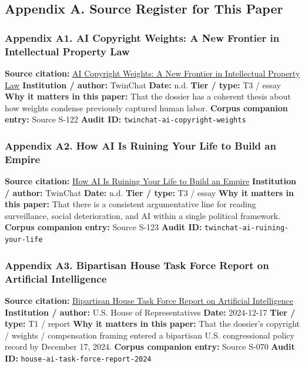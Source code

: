 \documentclass[
  american,
  11pt,
  letterpaper,
]{article}
\begin{document}
\subsection{Appendix A. Source Register for This
Paper}\label{appendix-a.-source-register-for-this-paper}

\subsubsection{Appendix A1. AI Copyright Weights: A New Frontier in
Intellectual Property
Law}\label{appendix-a1-ai-copyright-weights-a-new-frontier-in-intellectual-property-law}

\textbf{Source citation:}
\href{https://medium.com/twinchat/ai-copyright-weights-a-new-frontier-in-intellectual-property-law-d8ee1b6c55ee}{AI
Copyright Weights: A New Frontier in Intellectual Property Law}
\textbf{Institution / author:} TwinChat \textbf{Date:} n.d. \textbf{Tier
/ type:} T3 / essay \textbf{Why it matters in this paper:} That the
dossier has a coherent thesis about how weights condense previously
captured human labor. \textbf{Corpus companion entry:} Source S-122
\textbf{Audit ID:} \texttt{twinchat-ai-copyright-weights}

\subsubsection{Appendix A2. How AI Is Ruining Your Life to Build an
Empire}\label{appendix-a2-how-ai-is-ruining-your-life-to-build-an-empire}

\textbf{Source citation:}
\href{https://medium.com/twinchat/how-ai-is-ruining-your-life-to-build-an-empire-8b6d02e55bc9}{How
AI Is Ruining Your Life to Build an Empire} \textbf{Institution /
author:} TwinChat \textbf{Date:} n.d. \textbf{Tier / type:} T3 / essay
\textbf{Why it matters in this paper:} That there is a consistent
argumentative line for reading surveillance, social deterioration, and
AI within a single political framework. \textbf{Corpus companion entry:}
Source S-123 \textbf{Audit ID:} \texttt{twinchat-ai-ruining-your-life}

\subsubsection{Appendix A3. Bipartisan House Task Force Report on
Artificial
Intelligence}\label{appendix-a3-bipartisan-house-task-force-report-on-artificial-intelligence}

\textbf{Source citation:}
\href{https://www.speaker.gov/wp-content/uploads/2024/12/AI-Task-Force-Report-FINAL.pdf}{Bipartisan
House Task Force Report on Artificial Intelligence} \textbf{Institution
/ author:} U.S. House of Representatives \textbf{Date:} 2024-12-17
\textbf{Tier / type:} T1 / report \textbf{Why it matters in this paper:}
That the dossier's copyright / weights / compensation framing entered a
bipartisan U.S. congressional policy record by December 17, 2024.
\textbf{Corpus companion entry:} Source S-070 \textbf{Audit ID:}
\texttt{house-ai-task-force-report-2024}
\end{document}
